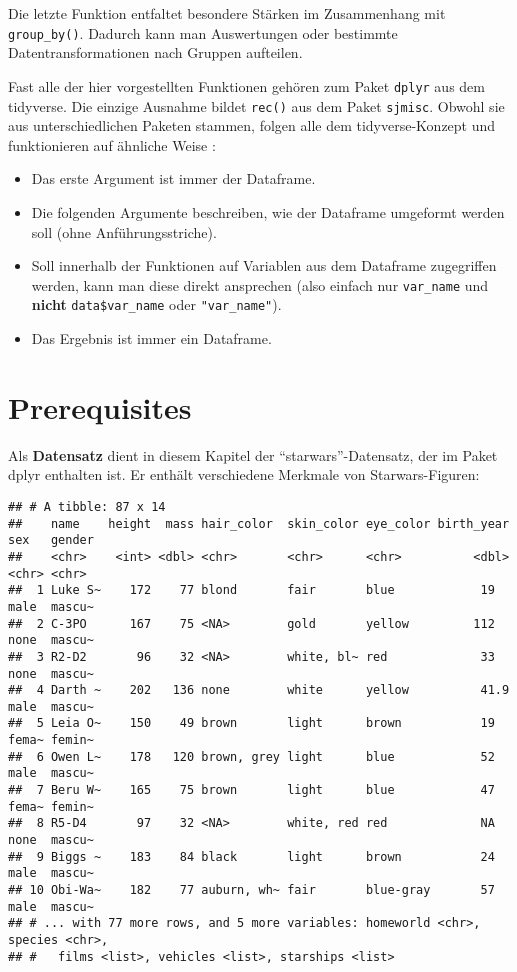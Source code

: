 \documentclass[
]{book}
\begin{document}
Die letzte Funktion entfaltet besondere Stärken im Zusammenhang mit \texttt{group\_by()}. Dadurch kann man Auswertungen oder bestimmte Datentransformationen nach Gruppen aufteilen.

Fast alle der hier vorgestellten Funktionen gehören zum Paket \texttt{dplyr} aus dem tidyverse. Die einzige Ausnahme bildet \texttt{rec()} aus dem Paket \texttt{sjmisc}. Obwohl sie aus unterschiedlichen Paketen stammen, folgen alle dem tidyverse-Konzept und funktionieren auf ähnliche Weise \citep[vgl.][Kap. 5.1.3]{Wickham_2017}:

\begin{itemize}
\item
  Das erste Argument ist immer der Dataframe.
\item
  Die folgenden Argumente beschreiben, wie der Dataframe umgeformt werden soll (ohne Anführungsstriche).
\item
  Soll innerhalb der Funktionen auf Variablen aus dem Dataframe zugegriffen werden, kann man diese direkt ansprechen (also einfach nur \texttt{var\_name} und \textbf{nicht} \texttt{data\$var\_name} oder \texttt{"var\_name"}).
\item
  Das Ergebnis ist immer ein Dataframe.
\end{itemize}

\hypertarget{prerequisites}{%
\section{Prerequisites}\label{prerequisites}}

Als \textbf{Datensatz} dient in diesem Kapitel der ``starwars''-Datensatz, der im Paket dplyr enthalten ist. Er enthält verschiedene Merkmale von Starwars-Figuren:

\begin{verbatim}
## # A tibble: 87 x 14
##    name    height  mass hair_color  skin_color eye_color birth_year sex   gender
##    <chr>    <int> <dbl> <chr>       <chr>      <chr>          <dbl> <chr> <chr> 
##  1 Luke S~    172    77 blond       fair       blue            19   male  mascu~
##  2 C-3PO      167    75 <NA>        gold       yellow         112   none  mascu~
##  3 R2-D2       96    32 <NA>        white, bl~ red             33   none  mascu~
##  4 Darth ~    202   136 none        white      yellow          41.9 male  mascu~
##  5 Leia O~    150    49 brown       light      brown           19   fema~ femin~
##  6 Owen L~    178   120 brown, grey light      blue            52   male  mascu~
##  7 Beru W~    165    75 brown       light      blue            47   fema~ femin~
##  8 R5-D4       97    32 <NA>        white, red red             NA   none  mascu~
##  9 Biggs ~    183    84 black       light      brown           24   male  mascu~
## 10 Obi-Wa~    182    77 auburn, wh~ fair       blue-gray       57   male  mascu~
## # ... with 77 more rows, and 5 more variables: homeworld <chr>, species <chr>,
## #   films <list>, vehicles <list>, starships <list>
\end{verbatim}
\end{document}
